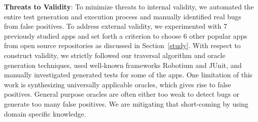 

{\bf Threats to Validity}: To minimize threats to internal validity, we automated the entire test generation and execution process and manually identified real bugs from false positives. To address external validity, we experimented with 7 previously studied apps and set forth a criterion to choose 6 other popular apps from open source repositories as discussed in Section~\ref{study}. With respect to construct validity, we strictly followed our traversal algorithm and oracle generation techniques, used well-known frameworks Robotium and JUnit, and manually investigated generated tests for some of the apps. 
One limitation of this work is synthesizing universally applicable oracles, which gives rise to false positives.
General purpose oracles are often either too weak to detect bugs or generate too many false positives. We are mitigating that short-coming by using domain specific knowledge. 

